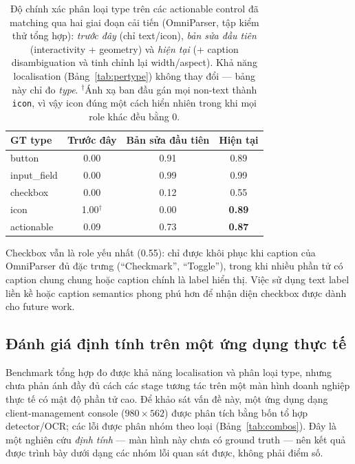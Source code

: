 \documentclass[11pt,a4paper]{article}
\newcommand{\code}[1]{\texttt{#1}}
\begin{document}
\begin{table}[H]
  \centering
  \caption{Độ chính xác phân loại type trên các actionable control đã matching qua
  hai giai đoạn cải tiến (OmniParser, tập kiểm thử tổng hợp): \emph{trước đây}
  (chỉ text/icon), \emph{bản sửa đầu tiên} (interactivity + geometry) và \emph{hiện
  tại} (+ caption disambiguation và tinh chỉnh lại width/aspect). Khả năng
  localisation (Bảng~\ref{tab:pertype}) không thay đổi --- bảng này chỉ đo
  \emph{type}. $^\dagger$Ánh xạ ban đầu gán mọi non-text thành \code{icon}, vì vậy
  icon đúng một cách hiển nhiên trong khi mọi role khác đều bằng 0.}
  \label{tab:typeacc}
  \begin{tabular}{lccc}
    \toprule
    GT type & Trước đây & Bản sửa đầu tiên & Hiện tại \\
    \midrule
    button       & 0.00 & 0.91 & 0.89 \\
    input\_field & 0.00 & 0.99 & 0.99 \\
    checkbox     & 0.00 & 0.12 & 0.55 \\
    icon         & 1.00$^\dagger$ & 0.00 & \textbf{0.89} \\
    \midrule
    actionable   & 0.09 & 0.73 & \textbf{0.87} \\
    \bottomrule
  \end{tabular}
\end{table}

Checkbox vẫn là role yếu nhất (0.55): chỉ được khôi phục khi caption của OmniParser
đủ đặc trưng (``Checkmark'', ``Toggle''), trong khi nhiều phần tử có caption chung
chung hoặc caption chính là label hiển thị. Việc sử dụng text label liền kề hoặc
caption semantics phong phú hơn để nhận diện checkbox được dành cho future work.


\subsection{Đánh giá định tính trên một ứng dụng thực tế}
\label{sec:realapp}
Benchmark tổng hợp đo được khả năng localisation và phân loại type, nhưng chưa phản
ánh đầy đủ cách các stage tương tác trên một màn hình doanh nghiệp thực tế có mật
độ phần tử cao. Để khảo sát vấn đề này, một ứng dụng dạng client-management console
($980\times562$) được phân tích bằng bốn tổ hợp detector/OCR; các lỗi được phân nhóm
theo loại (Bảng~\ref{tab:combos}). Đây là một nghiên cứu \emph{định tính} --- màn
hình này chưa có ground truth --- nên kết quả được trình bày dưới dạng các nhóm lỗi
quan sát được, không phải điểm số.
\end{document}
